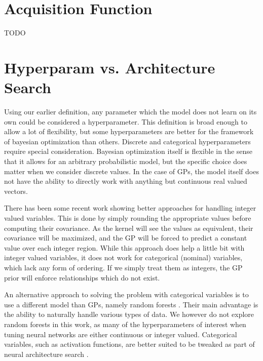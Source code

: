 \section{Acquisition Function}

TODO

\section{Hyperparam vs. Architecture Search}

Using our earlier definition, any parameter which the model does not learn on
its own could be considered a hyperparameter. This definition is broad enough
to allow a lot of flexibility, but some hyperparameters are better for the
framework of bayesian optimization than others. Discrete and categorical
hyperparameters require special consideration. Bayesian optimization itself is
flexible in the sense that it allows for an arbitrary probabilistic model, but
the specific choice does matter when we consider discrete values. In the case
of GPs, the model itself does not have the ability to directly work with
anything but continuous real valued vectors.

There has been some recent work \citep{integer-valued-gp} showing better
approaches for handling integer valued variables. This is done by simply
rounding the appropriate values before computing their covariance. As the
kernel will see the values as equivalent, their covariance will be maximized,
and the GP will be forced to predict a constant value over each integer region.
While this approach does help a little bit with integer valued variables, it
does not work for categorical (nominal) variables, which lack any form of
ordering. If we simply treat them as integers, the GP prior will enforce
relationships which do not exist.

An alternative approach to solving the problem with categorical variables is to
use a different model than GPs, namely random forests
\citep{nando-bayesian-out-of-the-loop}. Their main advantage is the ability to
naturally handle various types of data. We however do not explore random
forests in this work, as many of the hyperparameters of interest when tuning
neural networks are either continuous or integer valued. Categorical variables,
such as activation functions, are better suited to be tweaked as part of neural
architecture search \citep{nasnet}.

